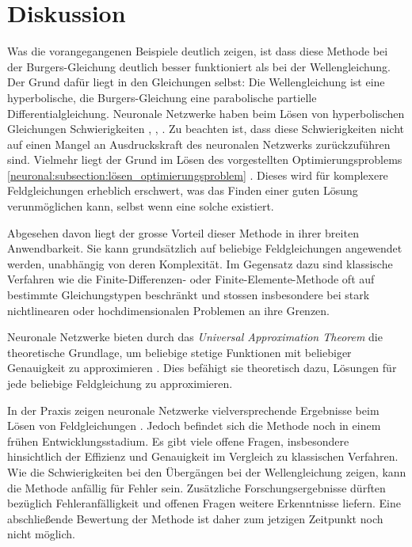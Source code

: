 %
%
%
%

\section{Diskussion}\label{neuronal:section:diskussion}

Was die vorangegangenen Beispiele deutlich zeigen, ist dass diese Methode bei der Burgers-Gleichung deutlich besser funktioniert als bei der Wellengleichung.
Der Grund dafür liegt in den Gleichungen selbst: 
Die Wellengleichung ist eine hyperbolische, die Burgers-Gleichung eine parabolische partielle Differentialgleichung.
Neuronale Netzwerke haben beim Lösen von hyperbolischen Gleichungen Schwierigkeiten \cite{neuronal:hyperbolisch_1}, \cite{neuronal:hyperbolisch_2}, \cite{neuronal:hyperbolisch_3}.
Zu beachten ist, dass diese Schwierigkeiten nicht auf einen Mangel an Ausdruckskraft des neuronalen Netzwerks zurückzuführen sind.
Vielmehr liegt der Grund im Lösen des vorgestellten Optimierungsproblems \ref{neuronal:subsection:lösen_optimierungsproblem} \cite{neuronal:hyperbolisch_4}.
Dieses wird für komplexere Feldgleichungen erheblich erschwert, was das Finden einer guten Lösung verunmöglichen kann, selbst wenn eine solche existiert. 

Abgesehen davon liegt der grosse Vorteil dieser Methode in ihrer breiten Anwendbarkeit.
Sie kann grundsätzlich auf beliebige Feldgleichungen angewendet werden, unabhängig von deren Komplexität.
Im Gegensatz dazu sind klassische Verfahren wie die Finite-Differenzen- oder Finite-Elemente-Methode oft auf bestimmte Gleichungstypen beschränkt und stossen insbesondere bei stark nichtlinearen oder hochdimensionalen Problemen an ihre Grenzen.

Neuronale Netzwerke bieten durch das \emph{Universal Approximation Theorem} die theoretische Grundlage, um beliebige stetige Funktionen mit beliebiger Genauigkeit zu approximieren \cite{neuronal:universal_approximation_theorem}.
Dies befähigt sie theoretisch dazu, Lösungen für jede beliebige Feldgleichung zu approximieren.

In der Praxis zeigen neuronale Netzwerke vielversprechende Ergebnisse beim Lösen von Feldgleichungen \cite{neuronal:pinns}.
Jedoch befindet sich die Methode noch in einem frühen Entwicklungsstadium.
Es gibt viele offene Fragen, insbesondere hinsichtlich der Effizienz und Genauigkeit im Vergleich zu klassischen Verfahren.
Wie die Schwierigkeiten bei den Übergängen bei der Wellengleichung zeigen, kann die Methode anfällig für Fehler sein.
Zusätzliche Forschungsergebnisse dürften bezüglich Fehleranfälligkeit und offenen Fragen weitere Erkenntnisse liefern.
Eine abschließende Bewertung der Methode ist daher zum jetzigen Zeitpunkt noch nicht möglich.

